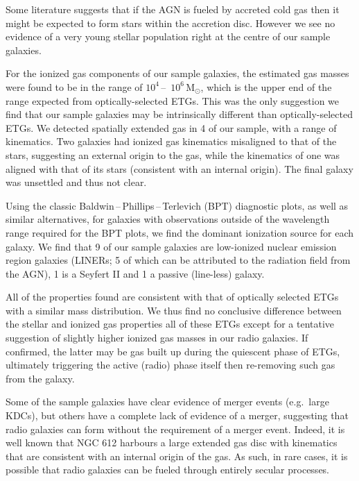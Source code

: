 \begin{abstractlong}
Some literature suggests that if the AGN is fueled by accreted cold gas then it might be expected to form stars within the accretion disc. However we see no evidence of a very young stellar population right at the centre of our sample galaxies. 

For the ionized gas components of our sample galaxies, the estimated gas masses were found to be in the range of $10^4$\,--\, $10^6\,\mathrm{M_\odot}$, which is the upper end of the range expected from optically-selected ETGs. This was the only suggestion we find that our sample galaxies may be intrinsically different than optically-selected ETGs. We detected spatially extended gas in 4 of our sample, with a range of kinematics. Two galaxies had ionized gas kinematics misaligned to that of the stars, suggesting an external origin to the gas, while the kinematics of one was aligned with that of its stars (consistent with an internal origin). The final galaxy was unsettled and thus not clear. 

Using the classic Baldwin\,--\,Phillips\,--\,Terlevich (BPT) diagnostic plots, as well as similar alternatives, for galaxies with observations outside of the wavelength range required for the BPT plots, we find the dominant ionization source for each galaxy. We find that 9 of our sample galaxies are low-ionized nuclear emission region galaxies (LINERs; 5 of which can be attributed to the radiation field from the AGN), 1 is a Seyfert II and 1 a passive (line-less) galaxy. 

All of the properties found are consistent with that of optically selected ETGs with a similar mass distribution. We thus find no conclusive difference between the stellar and ionized gas properties all of these ETGs except for a tentative suggestion of slightly higher ionized gas masses in our radio galaxies. If confirmed, the latter may be gas built up during the quiescent phase of ETGs, ultimately triggering the active (radio) phase itself then re-removing such gas from the galaxy.

Some of the sample galaxies have clear evidence of merger events (e.g.\ large KDCs), but others have a complete lack of evidence of a merger, suggesting that radio galaxies can form without the requirement of a merger event. Indeed, it is well known that NGC 612 harbours a large extended gas disc with kinematics that are consistent with an internal origin of the gas. As such, in rare cases, it is possible that radio galaxies can be fueled through entirely secular processes.
\end{abstractlong}